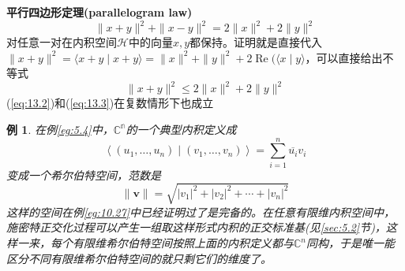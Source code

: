 \documentclass[hyperref,UTF8]{ctexbook}
\newtheorem{eg}{例}[chapter]
\begin{document}
\textbf{平行四边形定理(parallelogram law)}
\begin{equation}
    \|x+y\|^{2}+\|x-y\|^{2}=2\|x\|^{2}+2\|y\|^{2}\label{eq:13.2}
\end{equation}
对任意一对在内积空间\(\mathcal{H}\)中的向量\(x,y\)都保持。证明就是直接代入$\|x+y\|^{2}=\langle x+y \mid x+y\rangle=\|x\|^{2}+\|y\|^{2}+2 \operatorname{Re}(\langle x \mid y\rangle$，可以直接给出不等式
\begin{equation}
    \|x+y\|^{2} \leq 2\|x\|^{2}+2\|y\|^{2}\label{eq:13.3}
\end{equation}
(\ref{eq:13.2})和(\ref{eq:13.3})在复数情形下也成立
\begin{eg}
    在例\ref{eg:5.4}中，\(\mathbb{C^n}\)的一个典型内积定义成
    $$
\left\langle\left(u_{1}, \ldots, u_{n}\right) \mid\left(v_{1}, \ldots, v_{n}\right)\right\rangle=\sum_{i=1}^{n} \overline{u_{i}} v_{i}
$$
变成一个希尔伯特空间，范数是
$$
\|\mathbf{v}\|=\sqrt{\left|v_{1}\right|^{2}+\left|v_{2}\right|^{2}+\cdots+\left|v_{n}\right|^{2}}
$$
这样的空间在例\ref{eg:10.27}中已经证明过了是完备的。在任意有限维内积空间中，施密特正交化过程可以产生一组取这样形式内积的正交标准基(见\ref{sec:5.2}节)，这样一来，每个有限维希尔伯特空间按照上面的内积定义都与\(\mathbb{C}^n\)同构，于是唯一能区分不同有限维希尔伯特空间的就只剩它们的维度了。
\end{eg}
\end{document}
